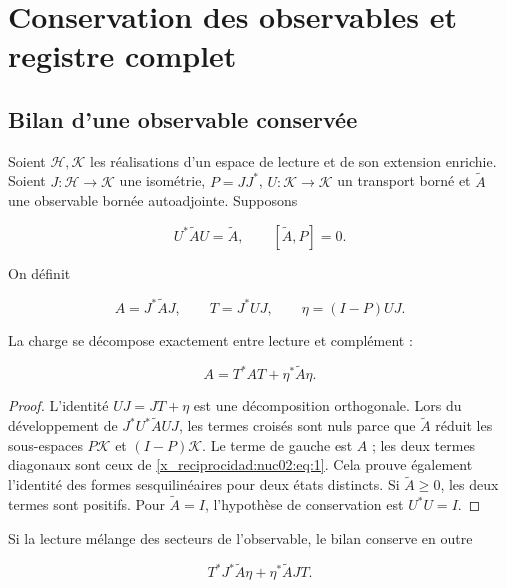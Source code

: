 \chapter{Conservation des observables et registre complet}
\label{x_reciprocidad:nuclear:2}
\section{Bilan d’une observable conservée}

Soient \(\mathcal H,\mathcal K\) les réalisations d’un espace de lecture et de son extension enrichie. Soient \(J:\mathcal H\to\mathcal K\) une isométrie, \(P=JJ^*\), \(U:\mathcal K\to\mathcal K\) un transport borné et \(\widetilde A\) une observable bornée autoadjointe. Supposons

\[
U^*\widetilde A U=\widetilde A,\qquad [\widetilde A,P]=0.
\]

On définit

\[
A=J^*\widetilde A J,\qquad T=J^*UJ,
\qquad \eta=(I-P)UJ.
\]

\begin{proposition}
\label{x_reciprocidad:nuc02:balance}
La charge se décompose exactement entre lecture et complément :

\begin{equation}
\boxed{A=T^*AT+\eta^*\widetilde A\eta.}\label{x_reciprocidad:nuc02:eq:1}
\end{equation}
\end{proposition}

\begin{proof}
L’identité \(UJ=JT+\eta\) est une décomposition orthogonale. Lors du développement de \(J^*U^*\widetilde A UJ\), les termes croisés sont nuls parce que \(\widetilde A\) réduit les sous-espaces \(P\mathcal K\) et \((I-P)\mathcal K\). Le terme de gauche est \(A\) ; les deux termes diagonaux sont ceux de \eqref{x_reciprocidad:nuc02:eq:1}. Cela prouve également l’identité des formes sesquilinéaires pour deux états distincts. Si \(\widetilde A\geq0\), les deux termes sont positifs. Pour \(\widetilde A=I\), l’hypothèse de conservation est \(U^*U=I\).
\end{proof}

Si la lecture mélange des secteurs de l’observable, le bilan conserve en outre

\[
T^*J^*\widetilde A\eta+\eta^*\widetilde A JT.
\]

